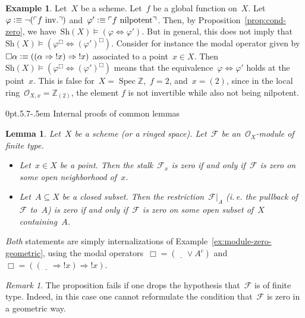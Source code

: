 \documentclass[10pt,reqno,a4paper]{amsbook}
\makeatletter
\theoremstyle{definition}
\newtheorem{ex}[defn]{Example}
\theoremstyle{plain}
\newtheorem{lemma}[defn]{Lemma}
\theoremstyle{remark}
\newtheorem{rem}[defn]{Remark}
\newcommand{\ZZ}{\mathbb{Z}}
\newcommand{\F}{\mathcal{F}}
\renewcommand{\O}{\mathcal{O}}
\newcommand{\placeholder}{\underline{\quad}}
\newcommand{\Sh}{\mathrm{Sh}}
\DeclareMathOperator{\Spec}{Spec}
\newcommand{\?}{\,{:}\,}
\renewcommand{\_}{\mathpunct{.}\,}
\newcommand{\speak}[1]{\ulcorner\text{\textnormal{#1}}\urcorner}
\newcommand{\notat}[1]{{!#1}}
\newcommand{\ie}{i.\,e.\@\xspace}
\newcommand{\inv}{inv.\@}
\newcommand{\defequiv}{\vcentcolon\equiv}
\renewenvironment{proof}[1][\proofname]{\par
  \pushQED{\qed}%
  \normalfont \topsep6\p@\@plus6\p@\relax
  \trivlist
  \item[\hskip\labelsep
        \itshape
    #1\@addpunct{.}]\ignorespaces
}{%
  \popQED\endtrivlist\@endpefalse
}
\def\subsection{\@startsection{subsection}{2}%
  {0pt}{.5\linespacing\@plus.7\linespacing}{-.5em}%
  {\normalfont\bfseries}}
\makeatother
\begin{document}
\begin{ex}\label{ex:translation-equivalence}Let~$X$ be a scheme. Let~$f$ be a
global function on~$X$. Let~$\varphi \defequiv \neg(\speak{$f$ \inv})$
and~$\varphi' \defequiv \speak{$f$ nilpotent}$. Then, by Proposition~\ref{prop:cond-zero}, we
have~$\Sh(X) \models (\varphi \Leftrightarrow \varphi')$. But in general, this
does not imply that~$\Sh(X) \models (\varphi^\Box \Leftrightarrow
(\varphi')^\Box)$. Consider for instance the modal operator given by~$\Box\alpha
\defequiv ((\alpha \Rightarrow \notat{x}) \Rightarrow \notat{x})$ associated to a
point~$x \in X$. Then~$\Sh(X) \models (\varphi^\Box \Leftrightarrow
(\varphi')^\Box)$ means that the equivalence~$\varphi \Leftrightarrow \varphi'$
holds at the point~$x$. This is false for~$X = \Spec \ZZ$,~$f = 2$, and~$x =
(2)$, since in the local ring~$\O_{X,x} = \ZZ_{(2)}$, the element $f$ is not invertible
while also not being nilpotent.
\end{ex}


\subsection{Internal proofs of common lemmas}

\begin{lemma}\label{lemma:module-zero-point-neighbourhood}
Let~$X$ be a scheme (or a ringed space). Let~$\F$ be an~$\O_X$-module
of finite type.
\begin{itemize}
\item Let~$x \in X$ be a point. Then the stalk~$\F_x$ is zero if and
only if~$\F$ is zero on some open neighborhood of~$x$.
\item Let~$A \subseteq X$ be a closed subset. Then the restriction~$\F|_A$ (\ie
the pullback of~$\F$ to~$A$) is zero if and only if~$\F$ is zero on some open
subset of~$X$ containing~$A$.
\end{itemize}
\end{lemma}
\begin{proof}\emph{Both} statements are simply internalizations of
Example~\ref{ex:module-zero-geometric}, using the modal operators~$\Box =
(\placeholder \vee A^c)$ and~$\Box = ((\placeholder \Rightarrow
\notat{x}) \Rightarrow \notat{x})$.
\end{proof}

\begin{rem}The proposition fails if one drops the hypothesis
that~$\F$ is of finite type. Indeed, in this case one cannot reformulate the
condition that~$\F$ is zero in a geometric way.\end{rem}
\end{document}
